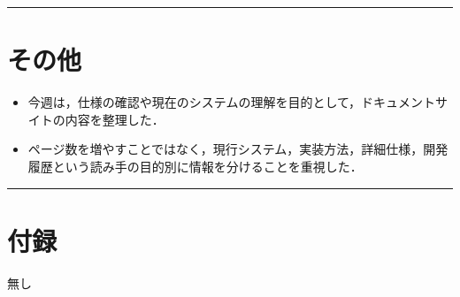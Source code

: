 \documentclass[uplatex,dvipdfmx,a4paper,11pt]{jsarticle}
\newcommand{\sectionrule}{\par\medskip\noindent\rule{\linewidth}{0.6pt}\par\medskip}
\begin{document}
\sectionrule

\section{その他}

\begin{itemize}
  \item 今週は，仕様の確認や現在のシステムの理解を目的として，ドキュメントサイトの内容を整理した．
  \item ページ数を増やすことではなく，現行システム，実装方法，詳細仕様，開発履歴という読み手の目的別に情報を分けることを重視した．
\end{itemize}

\sectionrule

\section{付録}

無し
\end{document}
